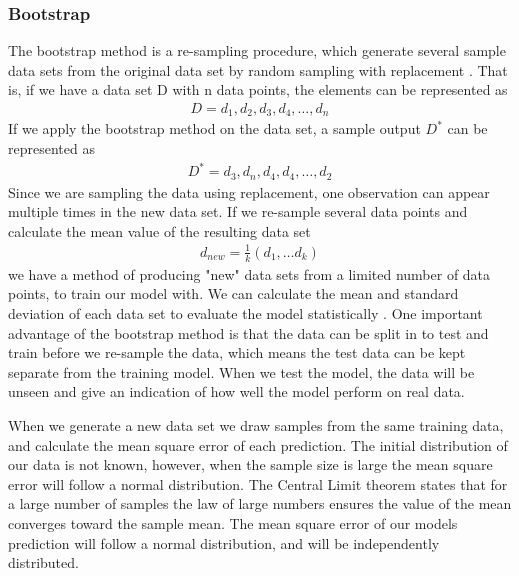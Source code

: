 \subsubsection{Bootstrap} 
\noindent The bootstrap method is a re-sampling procedure, which generate several sample data sets from the original data set by random sampling with replacement \cite{PSU}. That is, if we have a data set D with n data points, the elements can be represented as
%
\begin{align}
    D = {d_1, d_2, d_3, d_4, \dots, d_n}
\end{align}
If we apply the bootstrap method on the data set, a sample output $D^{*}$ can be represented as
%
\begin{align}
    D^{*} = {d_3, d_n, d_4, d_4 , \dots, d_2}
\end{align}
Since we are sampling the data using replacement, one observation can appear multiple times in the new data set. If we re-sample several data points and calculate the mean value of the resulting data set
\begin{align}
    d_{new} = \frac{1}{k}(d_1, \dots d_k)
\end{align}
we have a method of producing "new" data sets from a limited number of data points, to train our model with. We can calculate the mean and standard deviation of each data set to evaluate the model statistically \cite{MLM}.
%
One important advantage of the bootstrap method is that the data can be split in to 
test and train before we re-sample the data, which means the test data can be kept separate from the training model. When we test the model, the data will be unseen and give an indication of how well the model perform on real data. 

\noindent When we generate a new data set we draw samples from the same training data, and calculate the mean square error of each prediction. The initial distribution of our data is not known, however, when the sample size is large the mean square error will follow a normal distribution. The Central Limit theorem \cite{JAY2021CLT} states that for a large number of samples the law of large numbers \cite{JAY2021LLN} ensures the value of the mean converges toward the sample mean. The mean square error of our models prediction will follow a normal distribution, and will be independently distributed.

